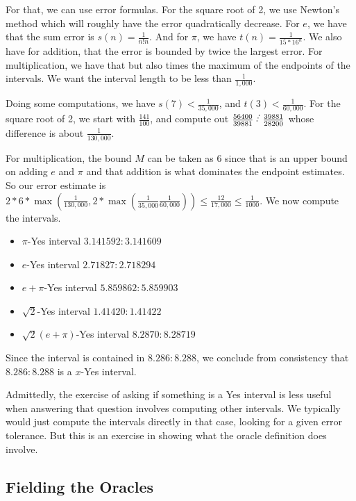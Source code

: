 \documentclass[12pt]{article}
\begin{document}
For that, we can use error formulas. For the square root of 2, we use Newton's method which will roughly have the error quadratically decrease.  For $e$, we have that the sum error is $s(n) = \frac{1}{n!n}$. And for $\pi$, we have $t(n) = \frac{1}{15 * 16^n}$. We also have for addition, that the error is bounded by twice the largest error. For multiplication, we have that but also times the maximum of the endpoints of the intervals. We want the interval length to be less than $\frac{1}{1,000}$. 

Doing some computations, we have $s(7) < \frac{1}{35,000}$, and $t(3) < \frac{1}{60,000}$. For the square root of 2, we start with $\frac{141}{100}$, and compute out $\frac{56400}{39881} \lte \frac{39881}{28200}$ whose difference is about $\frac{1}{130,000}$.

For multiplication, the bound $M$ can be taken as 6 since that is an upper bound on adding $e$ and $\pi$ and that addition is what dominates the endpoint estimates. So our error estimate is $2*6*\max(\frac{1}{130,000}, 2*\max(\frac{1}{35,000}\frac{1}{60,000})) \leq \frac{12}{17,000} \leq \frac{1}{1000}$. We now compute the intervals.  
\begin{itemize}
    \item $\pi$-Yes interval $3.141592:3.141609$
    \item $e$-Yes interval $2.71827:2.718294$
    \item $e + \pi$-Yes interval $5.859862:5.859903$
    \item $\sqrt{2}$-Yes interval $1.41420:1.41422$
    \item $\sqrt{2}(e + \pi)$-Yes interval  $8.2870:8.28719$
\end{itemize}

Since the interval is contained in $8.286:8.288$, we conclude from consistency that $8.286:8.288$ is a $x$-Yes interval. 

Admittedly, the exercise of asking if something is a Yes interval is less useful when answering that question involves computing other intervals. We typically would just compute the intervals directly in that case, looking for a given error tolerance. But this is an exercise in showing what the oracle definition does involve. 



\subsection{Fielding the Oracles}
\end{document}
